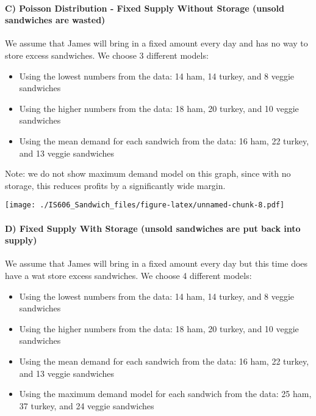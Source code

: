 \documentclass[]{article}
\begin{document}
\paragraph{C) Poisson Distribution - Fixed Supply Without Storage
(unsold sandwiches are
wasted)}\label{c-poisson-distribution---fixed-supply-without-storage-unsold-sandwiches-are-wasted}

We assume that James will bring in a fixed amount every day and has no
way to store excess sandwiches. We choose 3 different models:

\begin{itemize}
\itemsep1pt\parskip0pt
\item
  Using the lowest numbers from the data: 14 ham, 14 turkey, and 8
  veggie sandwiches
\item
  Using the higher numbers from the data: 18 ham, 20 turkey, and 10
  veggie sandwiches
\item
  Using the mean demand for each sandwich from the data: 16 ham, 22
  turkey, and 13 veggie sandwiches
\end{itemize}

Note: we do not show maximum demand model on this graph, since with no
storage, this reduces profits by a significantly wide margin.

\texttt{[image: ./IS606\_Sandwich\_files/figure-latex/unnamed-chunk-8.pdf]}

\paragraph{D) Fixed Supply With Storage (unsold sandwiches are put back
into
supply)}\label{d-fixed-supply-with-storage-unsold-sandwiches-are-put-back-into-supply}

We assume that James will bring in a fixed amount every day but this
time does have a wat store excess sandwiches. We choose 4 different
models:

\begin{itemize}
\itemsep1pt\parskip0pt
\item
  Using the lowest numbers from the data: 14 ham, 14 turkey, and 8
  veggie sandwiches
\item
  Using the higher numbers from the data: 18 ham, 20 turkey, and 10
  veggie sandwiches
\item
  Using the mean demand for each sandwich from the data: 16 ham, 22
  turkey, and 13 veggie sandwiches
\item
  Using the maximum demand model for each sandwich from the data: 25
  ham, 37 turkey, and 24 veggie sandwiches
\end{itemize}
\end{document}
